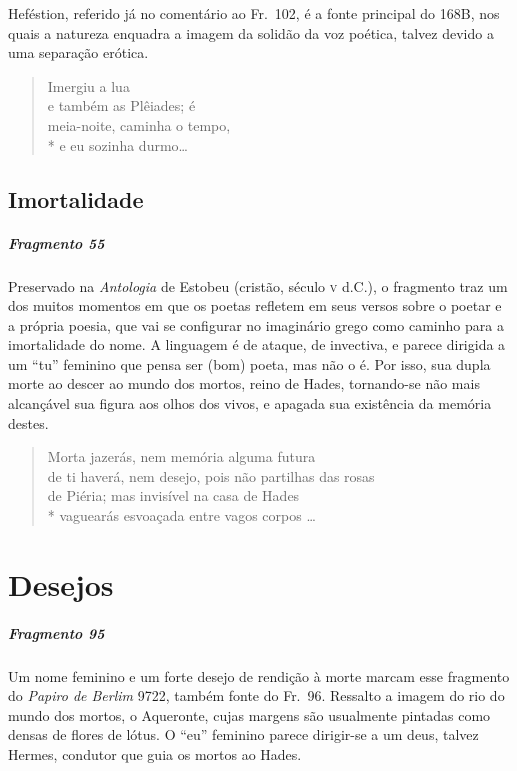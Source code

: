 {\small Heféstion, referido já no comentário ao Fr.~102, é a fonte principal do 168B,
nos quais a natureza enquadra a imagem da solidão da voz poética, talvez devido
a uma separação erótica.}

\begin{verse}
Imergiu a lua\\
e também as Plêiades; é\\
meia-noite, caminha o tempo,\\*
e eu sozinha durmo\ldots{}
\end{verse}

\section{Imortalidade}

\paragraph{Fragmento 55}

{\small Preservado na \textit{Antologia }de Estobeu (cristão, século \textsc{v} d.C.), o
fragmento traz um dos muitos momentos em que os poetas refletem em seus versos
sobre o poetar e a própria poesia, que vai se configurar no imaginário grego
como caminho para a imortalidade do nome. A linguagem é de ataque, de
invectiva, e parece dirigida a um “tu” feminino que pensa ser (bom) poeta, mas
não o é. Por isso, sua dupla morte ao descer ao mundo dos mortos, reino de
Hades, tornando-se não mais alcançável sua figura aos olhos dos vivos, e
apagada sua existência da memória destes.}
\pagebreak
\begin{verse}
Morta jazerás, nem memória alguma futura\\
de ti haverá, nem desejo, pois não partilhas das rosas\\
de Piéria; mas invisível na casa de Hades\\*
vaguearás esvoaçada entre vagos corpos \ldots{}
\end{verse}


\chapter{Desejos}

\paragraph{Fragmento 95}

{\small Um nome feminino e um forte desejo de rendição à morte marcam esse fragmento do
\textit{Papiro de Berlim }9722, também fonte do Fr.~96. Ressalto a imagem do
rio do mundo dos mortos, o Aqueronte, cujas margens são usualmente pintadas
como densas de flores de lótus. O “eu” feminino parece dirigir-se a um deus,
talvez Hermes, condutor que guia os mortos ao Hades.}

